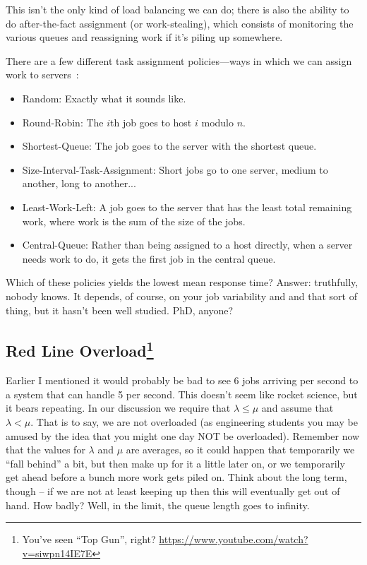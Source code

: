 \documentclass[a4paper]{report}
\begin{document}
This isn't the only kind of load balancing we can do; there is also the ability to do after-the-fact assignment (or work-stealing), which consists of monitoring the various queues and reassigning work if it's piling up somewhere.

There are a few different task assignment policies---ways in which we can assign work to servers~\cite{pmd}:

\begin{itemize}
	\item Random: Exactly what it sounds like.
	\item Round-Robin: The $i$th job goes to host $i$ modulo $n$.
	\item Shortest-Queue: The job goes to the server with the shortest queue.
	\item Size-Interval-Task-Assignment: Short jobs go to one server, medium to another, long to another...
	\item Least-Work-Left: A job goes to the server that has the least total remaining work, where work is the sum of the size of the jobs.
	\item Central-Queue: Rather than being assigned to a host directly, when a server needs work to do, it gets the first job in the central queue.
\end{itemize}

Which of these policies yields the lowest mean response time? Answer: truthfully, nobody knows. It depends, of course, on your job variability and and that sort of thing, but it hasn't been well studied. PhD, anyone?

\subsection*{Red Line Overload\footnote{You've seen ``Top Gun'', right? \url{https://www.youtube.com/watch?v=siwpn14IE7E}}}

Earlier I mentioned it would probably be bad to see 6 jobs arriving per second to a system that can handle 5 per second. This doesn't seem like rocket science, but it bears repeating. In our discussion we require that $\lambda \leq \mu$ and assume that $\lambda < \mu$. That is to say, we are not overloaded (as engineering students you may be amused by the idea that you might one day NOT be overloaded). Remember now that the values for $\lambda$ and $\mu$ are averages, so it could happen that temporarily we ``fall behind'' a bit, but then make up for it a little later on, or we temporarily get ahead before a bunch more work gets piled on. Think about the long term, though -- if we are not at least keeping up then this will eventually get out of hand. How badly? Well, in the limit, the queue length goes to infinity.
\end{document}
